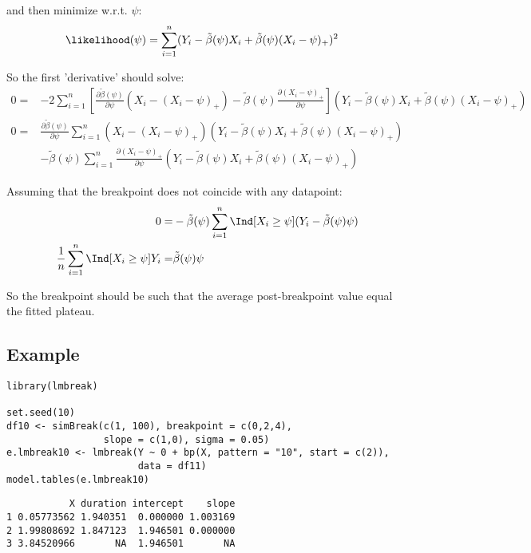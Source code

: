 \documentclass[12pt]{article}
\begin{document}
and then minimize w.r.t. \(\psi\):
\begin{align*}
\likelihood(\psi) &= \sum_{i=1}^n (Y_i - \tilde{\beta}(\psi) X_i + \tilde{\beta}(\psi) (X_i - \psi)_+)^2
\end{align*}

So the first 'derivative' should solve:
\begin{align*}
0 =& -2 \sum_{i=1}^n \left[
  \frac{\partial \tilde{\beta}(\psi)}{\partial \psi} (X_i - (X_i - \psi)_+)
- \tilde{\beta}(\psi)\frac{\partial (X_i - \psi)_+}{\partial \psi}\right]
(Y_i - \tilde{\beta}(\psi) X_i + \tilde{\beta}(\psi)(X_i - \psi)_+ ) \\
0 =& \frac{\partial \tilde{\beta}(\psi)}{\partial \psi} \sum_{i=1}^n (X_i - (X_i - \psi)_+)(Y_i - \tilde{\beta}(\psi) X_i + \tilde{\beta}(\psi)(X_i - \psi)_+ ) \\
& - \tilde{\beta}(\psi)\sum_{i=1}^n\frac{\partial (X_i - \psi)_+}{\partial \psi}(Y_i - \tilde{\beta}(\psi) X_i + \tilde{\beta}(\psi)(X_i - \psi)_+ ) 
\end{align*}

Assuming that the breakpoint does not coincide with any datapoint:
\begin{align*}
0 =& - \tilde{\beta}(\psi)\sum_{i=1}^n \Ind[X_i \geq \psi] (Y_i - \tilde{\beta}(\psi) \psi)  \\
\frac{1}{n}\sum_{i=1}^n \Ind[X_i \geq \psi] Y_i =& \tilde{\beta}(\psi) \psi
\end{align*}

So the breakpoint should be such that the average post-breakpoint value equal the fitted plateau.

\clearpage

\subsection{Example}
\label{sec:org70a8a21}

\lstset{language=r,label= ,caption= ,captionpos=b,numbers=none}
\begin{lstlisting}
library(lmbreak)

set.seed(10)
df10 <- simBreak(c(1, 100), breakpoint = c(0,2,4),
                 slope = c(1,0), sigma = 0.05)
e.lmbreak10 <- lmbreak(Y ~ 0 + bp(X, pattern = "10", start = c(2)),
                       data = df11)
model.tables(e.lmbreak10)
\end{lstlisting}

\begin{verbatim}
           X duration intercept    slope
1 0.05773562 1.940351  0.000000 1.003169
2 1.99808692 1.847123  1.946501 0.000000
3 3.84520966       NA  1.946501       NA
\end{verbatim}
\end{document}

